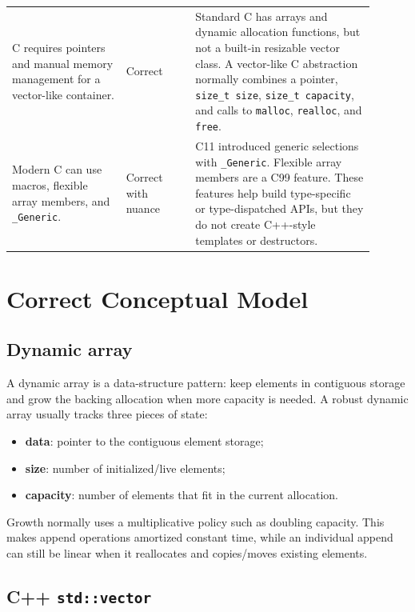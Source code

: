 \documentclass[11pt]{article}
\begin{document}
\begin{longtable}{>{\raggedright\arraybackslash}p{0.29\linewidth}>{\raggedright\arraybackslash}p{0.17\linewidth}>{\raggedright\arraybackslash}p{0.44\linewidth}}
\addlinespace
C requires pointers and manual memory management for a vector-like container. & Correct & Standard C has arrays and dynamic allocation functions, but not a built-in resizable vector class. A vector-like C abstraction normally combines a pointer, \texttt{size\_t size}, \texttt{size\_t capacity}, and calls to \texttt{malloc}, \texttt{realloc}, and \texttt{free}. \cite{cppref-malloc,cppref-realloc} \\
\addlinespace
Modern C can use macros, flexible array members, and \texttt{\_Generic}. & Correct with nuance & C11 introduced generic selections with \texttt{\_Generic}. Flexible array members are a C99 feature. These features help build type-specific or type-dispatched APIs, but they do not create C++-style templates or destructors. \cite{cppref-generic,cppref-struct} \\
\bottomrule
\end{longtable}

\section{Correct Conceptual Model}

\subsection*{Dynamic array}

A dynamic array is a data-structure pattern: keep elements in contiguous storage and grow the backing allocation when more capacity is needed. A robust dynamic array usually tracks three pieces of state:

\begin{itemize}
  \item \textbf{data}: pointer to the contiguous element storage;
  \item \textbf{size}: number of initialized/live elements;
  \item \textbf{capacity}: number of elements that fit in the current allocation.
\end{itemize}

Growth normally uses a multiplicative policy such as doubling capacity. This makes append operations amortized constant time, while an individual append can still be linear when it reallocates and copies/moves existing elements.

\subsection*{C++ \texttt{std::vector}}
\end{document}
